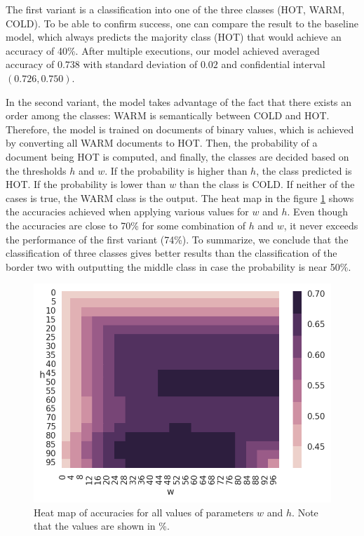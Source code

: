 \documentclass[
  digital, %
  notable,   %
  nolof,     %
  nolot,     %
]{fithesis3}
\begin{document}
The first variant is a classification into one of the three classes (HOT, WARM, COLD).
To be able to confirm success, one can compare the result to the baseline model, which always predicts the majority class (HOT) that would achieve an accuracy of 40\%.
After multiple executions, our model achieved averaged accuracy of $0.738$ with standard deviation of $0.02$ and confidential interval $(0.726, 0.750)$.

In the second variant, the model takes advantage of the fact that there exists an order among the classes: WARM is semantically between COLD and HOT.
Therefore, the model is trained on documents of binary values, which is achieved by converting all WARM documents to HOT.
Then, the probability of a document being HOT is computed, and finally, the classes are decided based on the thresholds $h$ and $w$.
If the probability is higher than $h$, the class predicted is HOT.
If the probability is lower than $w$ than the class is COLD.
If neither of the cases is true, the WARM class is the output.
The heat map in the figure \ref{fig:doc_two_class} shows the accuracies achieved when applying various values for $w$ and $h$.
Even though the accuracies are close to 70\% for some combination of $h$ and $w$, it never exceeds the performance of the first variant (74\%).
To summarize, we conclude that the classification of three classes gives better results than the classification of the border two with outputting the middle class in case the probability is near 50\%.

\begin{figure}[H]
\caption{Heat map of accuracies for all values of parameters $w$ and $h$. Note that the values are shown in \%.}
\label{fig:doc_two_class}
\includegraphics[width=\textwidth]{img/doc_two_class}
\end{figure}
\end{document}
